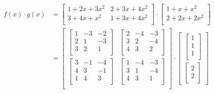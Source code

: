 \begin{align*}
  f(x) \cdot g(x) & = {
  \begin{bmatrix}
    1+2x+3x^2 & 2+3x+4x^2 \\
    3+4x+x^2  & 1+3x+4x^2 \\
  \end{bmatrix}
  \cdot
  \begin{bmatrix}
    1+x+x^2   \\
    2+2x+2x^2 \\
  \end{bmatrix}
  }                      \\
                  & = {
  \begin{bmatrix}
    \begin{bmatrix}
      1 & -3 & -2 \\
      2 & 1  & -3 \\
      3 & 2  & 1  \\
    \end{bmatrix} & 
    \begin{bmatrix}
      2 & -4 & -3 \\
      3 & 2  & -4 \\
      4 & 3  & 2  \\
    \end{bmatrix}   \\
    \begin{bmatrix}
      3 & -1 & -4 \\
      4 & 3  & -1 \\
      1 & 4  & 3  \\
    \end{bmatrix} & 
    \begin{bmatrix}
      1 & -4 & -3 \\
      3 & 1  & -4 \\
      4 & 3  & 1  \\
    \end{bmatrix}   \\
  \end{bmatrix}
  \cdot
  \begin{bmatrix}
    \begin{bmatrix}
      1 \\
      1 \\
      1 \\
    \end{bmatrix} \\
    \begin{bmatrix}
      2 \\
      2 \\

\end{bmatrix}
\end{bmatrix}}
\end{align*}
